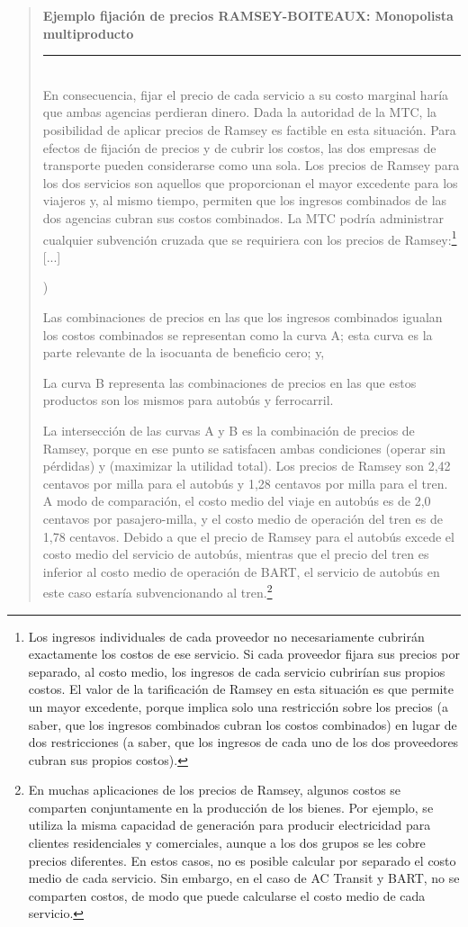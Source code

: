 \documentclass[10pt,a4paper]{article}
\newcounter{alphaitem}
\newenvironment{la}
      {\begin{list}{\alph{alphaitem})}{%
          \usecounter{alphaitem}%
          \setlength{\leftmargin}{1cm}%
          \setlength{\parskip}{3pt}%
          \setlength{\itemsep}{0pt}%
          \setlength{\parsep}{0pt}%
      }}
      {\end{list}}
\newenvironment{specialblock}[1]{%
      \begin{quote} %
      \small %
      \noindent\textbf{#1}\\[-0.3em] %
      \rule{\linewidth}{0.4pt}\\[0.6em]}{
      \end{quote}}
\begin{document}
\begin{specialblock}{Ejemplo fijación de precios RAMSEY-BOITEAUX: Monopolista multiproducto}
    En consecuencia, fijar el precio de cada servicio a su costo marginal haría que ambas agencias perdieran dinero. Dada la autoridad de la MTC, la posibilidad de aplicar precios de Ramsey es factible en esta situación. Para efectos de fijación de precios y de cubrir los costos, las dos empresas de transporte pueden considerarse como una sola. Los precios de Ramsey para los dos servicios son aquellos que proporcionan el mayor excedente para los viajeros y, al mismo tiempo, permiten que los ingresos combinados de las dos agencias cubran sus costos combinados. La MTC podría administrar cualquier subvención cruzada que se requiriera con los precios de Ramsey:\footnote{%
        Los ingresos individuales de cada proveedor no necesariamente cubrirán exactamente los costos de ese servicio. Si cada proveedor fijara sus precios por separado, al costo medio, los ingresos de cada servicio cubrirían sus propios costos. El valor de la tarificación de Ramsey en esta situación es que permite un mayor excedente, porque implica solo una restricción sobre los precios (a saber, que los ingresos combinados cubran los costos combinados) en lugar de dos restricciones (a saber, que los ingresos de cada uno de los dos proveedores cubran sus propios costos).
    }  [...]  
    \begin{la}
        \item Las combinaciones de precios en las que los ingresos combinados igualan los costos combinados se representan como la curva A; esta curva es la parte relevante de la isocuanta de beneficio cero; y,
        \item La curva B representa las combinaciones de precios en las que estos productos son los mismos para autobús y ferrocarril.
    \end{la}   
    
    La intersección de las curvas A y B es la combinación de precios de Ramsey, porque en ese punto se satisfacen ambas condiciones (operar sin pérdidas) y (maximizar la utilidad total). Los precios de Ramsey son 2,42 centavos por milla para el autobús y 1,28 centavos por milla para el tren. A modo de comparación, el costo medio del viaje en autobús es de 2,0 centavos por pasajero-milla, y el costo medio de operación del tren es de 1,78 centavos. Debido a que el precio de Ramsey para el autobús excede el costo medio del servicio de autobús, mientras que el precio del tren es inferior al costo medio de operación de BART, el servicio de autobús en este caso estaría subvencionando al tren.\footnote{%
        En muchas aplicaciones de los precios de Ramsey, algunos costos se comparten conjuntamente en la producción de los bienes. Por ejemplo, se utiliza la misma capacidad de generación para producir electricidad para clientes residenciales y comerciales, aunque a los dos grupos se les cobre precios diferentes. En estos casos, no es posible calcular por separado el costo medio de cada servicio. Sin embargo, en el caso de AC Transit y BART, no se comparten costos, de modo que puede calcularse el costo medio de cada servicio.
    } 
\end{specialblock}
\end{document}
